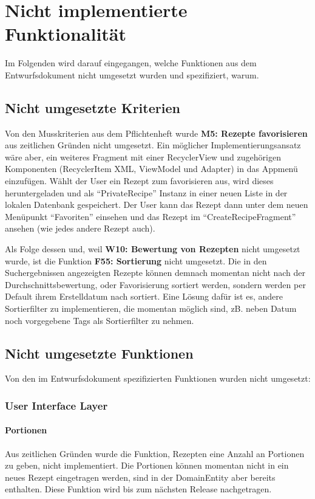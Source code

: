 \chapter{Nicht implementierte Funktionalität}

Im Folgenden wird darauf eingegangen, welche Funktionen aus dem Entwurfsdokument nicht umgesetzt wurden und spezifiziert, warum.

\section{Nicht umgesetzte Kriterien}

Von den Musskriterien aus dem Pflichtenheft wurde \textbf{M5: Rezepte favorisieren} aus zeitlichen Gründen nicht umgesetzt. 
Ein möglicher Implementierungsansatz wäre aber, ein weiteres Fragment mit einer RecyclerView und zugehörigen Komponenten (RecyclerItem XML, ViewModel und Adapter) in das Appmenü einzufügen. Wählt der User ein Rezept zum favorisieren aus, wird dieses heruntergeladen und als "`PrivateRecipe"' Instanz in einer neuen Liste in der lokalen Datenbank gespeichert. Der User kann das Rezept dann unter dem neuen Menüpunkt "`Favoriten"' einsehen und das Rezept im "`CreateRecipeFragment"' ansehen (wie jedes andere Rezept auch).

Als Folge dessen und, weil \textbf{W10: Bewertung von Rezepten} nicht umgesetzt wurde, ist die Funktion \textbf{F55: Sortierung} nicht umgesetzt. Die in den Suchergebnissen angezeigten Rezepte können demnach momentan nicht nach der Durchschnittsbewertung, oder Favorisierung sortiert werden, sondern werden per Default ihrem Erstelldatum nach sortiert. Eine Lösung dafür ist es, andere Sortierfilter zu implementieren, die momentan möglich sind, zB. neben Datum noch vorgegebene Tags als Sortierfilter zu nehmen.

\section{Nicht umgesetzte Funktionen}

Von den im Entwurfsdokument spezifizierten Funktionen wurden nicht umgesetzt:

\subsection{User Interface Layer}

\subsubsection{Portionen}
Aus zeitlichen Gründen wurde die Funktion, Rezepten eine Anzahl an Portionen zu geben, nicht implementiert. Die Portionen können momentan nicht in ein neues Rezept eingetragen werden, sind in der DomainEntity aber bereits enthalten. Diese Funktion wird bis zum nächsten Release nachgetragen.


